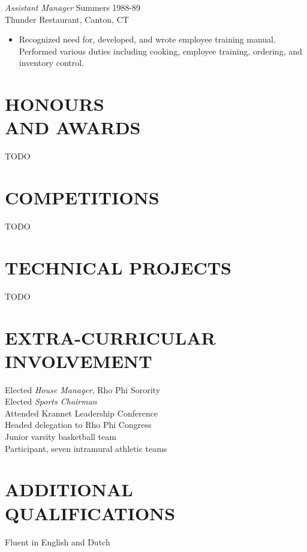 \documentclass[margin]{res}
\begin{document}
\begin{resume}
	{\sl Assistant Manager} \hfill Summers 1988-89 \\
    Thunder Restaurant, Canton, CT
	\begin{itemize}
    \item Recognized need for, developed, and wrote employee training manual.
    Performed various duties including cooking, employee training, ordering, and inventory control.
	\end{itemize} 

\section{HONOURS \\ AND AWARDS}
  TODO
 
\section{COMPETITIONS}
  TODO

\section{TECHNICAL PROJECTS}
  TODO

\section{EXTRA-CURRICULAR \\ INVOLVEMENT} %
            Elected {\it House Manager}, Rho Phi Sorority \\
            Elected {\it Sports Chairman} \\
            Attended Krannet Leadership Conference \\
                Headed delegation to Rho Phi Congress \\
                Junior varsity basketball team \\
                Participant, seven intramural athletic teams 
 
\section{ADDITIONAL \\QUALIFICATIONS}
			Fluent in English and Dutch

\end{resume}
\end{document}
